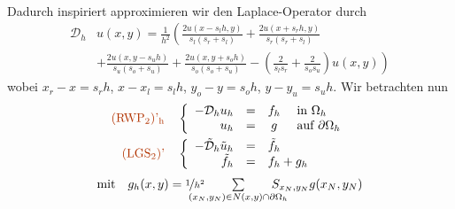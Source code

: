 \documentclass{cheat-sheet}
\newcommand{\bOmega}{\partial \Omega} %
\newcommand{\tss}[1]{\textsubscript{#1}} %
\newcommand{\DO}{\mathcal{D}} %
\newcommand{\probl}[1]{\textcolor{ProblemColor}{#1}}
\begin{document}
\begin{verf} \mbox{}\\
  Dadurch inspiriert approximieren wir den Laplace-Operator durch
  \begin{align*}
    \DO_h & u(x, y) = \frac{1}{h^2} \left( \frac{2 u(x - s_l h, y)}{s_l (s_r {+} s_l)} + \frac{2 u(x+s_r h, y)}{s_r (s_r {+} s_l)} \right. \\
    & \left. + \frac{2 u(x, y {-} s_u h)}{s_u (s_o {+} s_u)}  + \frac{2 u(x, y {+} s_o h)}{s_o (s_o {+} s_u)} - \left( \frac{2}{s_l s_r} + \frac{2}{s_o s_u} \right) u(x, y) \right)
  \end{align*}
  wobei
  $x_r - x = s_r h$, \enspace
  $x - x_l = s_l h$, \enspace
  $y_o - y = s_o h$, \enspace
  $y - y_u = s_u h$.
  Wir betrachten nun
  \begin{align*}
    \text{\probl{(RWP\tss{2})'\tss{h}}} \quad
    & \left\{ \begin{array}{rrcl}
      - \DO_h u_h &=& f_h &\text{ in $\Omega_h$} \\
      u_h &=& g &\text{ auf $\bOmega_h$}
    \end{array} \right. \\
    \text{\probl{(LGS\tss{2})'}} \quad
    & \left\{ \begin{array}{rcl}
      - \tilde{\DO}_h \tilde{u}_h &=& \tilde{f}_h \\
      \tilde{f}_h &=& f_h + g_h
    \end{array} \right.
  \end{align*}
  \[
    \text{mit} \quad
    g_h(x, y) = \nicefrac{1}{h^2} \qquad \sum_{\mathclap{(x_N, y_N) \in N(x, y) \cap \bOmega_h}} \qquad S_{x_N,y_N} g(x_N, y_N)
  \]
  

\end{verf}
\end{document}
